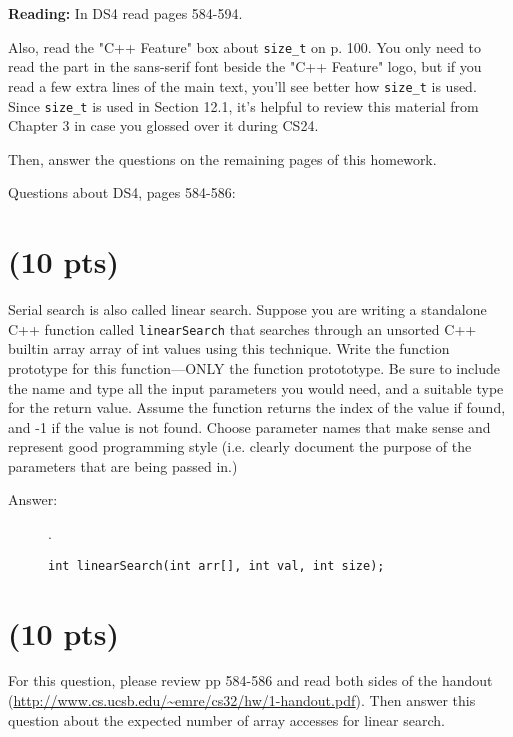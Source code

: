 \documentclass[11pt]{article}
\begin{document}
\textbf{Reading:} In DS4 read pages 584-594.

Also, read the "C++ Feature" box about \texttt{size\_t} on p. 100. You only
need to read the part in the sans-serif font beside the "C++ Feature"
logo, but if you read a few extra lines of the main text, you'll see
better how \texttt{size\_t} is used. Since \texttt{size\_t} is used in Section 12.1,
it's helpful to review this material from Chapter 3 in case you
glossed over it during CS24.

Then, answer the questions on the remaining pages of this homework.

\newpage

Questions about DS4, pages 584-586:

\section{(10 pts)}
\label{sec:orged7d330}

Serial search is also called linear search. Suppose you are writing
a standalone C++ function called \texttt{linearSearch} that searches
through an unsorted C++ builtin array array of int values using this
technique. Write the function prototype for this function—ONLY the
function protototype. Be sure to include the name and type all the
input parameters you would need, and a suitable type for the return
value. Assume the function returns the index of the value if found,
and -1 if the value is not found. Choose parameter names that make
sense and represent good programming style (i.e. clearly document
the purpose of the parameters that are being passed in.)

\begin{description}
    \item[Answer:] .\\
    \begin{verbatim}
int linearSearch(int arr[], int val, int size);
    \end{verbatim}
\end{description}

\vspace{4em}

\section{(10 pts)}
\label{sec:orgfab6161}
For this question, please review pp 584-586 and read both sides of
the handout
(\url{http://www.cs.ucsb.edu/\~emre/cs32/hw/1-handout.pdf}). Then
answer this question about the expected number of array accesses for
linear search.
\end{document}
